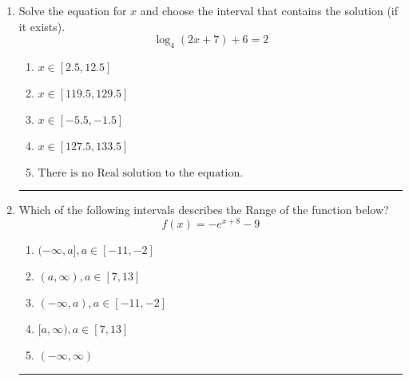 \documentclass[14pt]{extbook}
\newcommand{\litem}[1]{\item#1\hspace*{-1cm}\rule{\textwidth}{0.4pt}}
\begin{document}
\begin{enumerate}
{\begin{enumerate}[label=\Alph*.]
\end{enumerate} }
\litem{
Solve the equation for $x$ and choose the interval that contains the solution (if it exists).\[ \log_{4}{(2x+7)}+6 = 2 \]\begin{enumerate}[label=\Alph*.]
\item \( x \in [2.5, 12.5] \)
\item \( x \in [119.5, 129.5] \)
\item \( x \in [-5.5, -1.5] \)
\item \( x \in [127.5, 133.5] \)
\item \( \text{There is no Real solution to the equation.} \)

\end{enumerate} }
\litem{
Which of the following intervals describes the Range of the function below?\[ f(x) = -e^{x+8}-9 \]\begin{enumerate}[label=\Alph*.]
\item \( (-\infty, a], a \in [-11, -2] \)
\item \( (a, \infty), a \in [7, 13] \)
\item \( (-\infty, a), a \in [-11, -2] \)
\item \( [a, \infty), a \in [7, 13] \)
\item \( (-\infty, \infty) \)

\end{enumerate} }
\end{enumerate}
\end{document}

